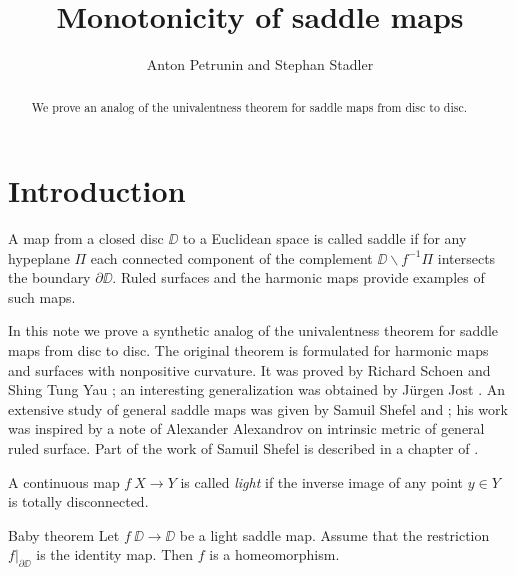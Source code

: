 \documentclass{article}
\begin{document}
\title{Monotonicity of saddle maps}
\author{Anton Petrunin and Stephan Stadler}


\date{}

\maketitle

\begin{abstract}
We prove an analog of the univalentness theorem for saddle maps from disc to disc.
\end{abstract}

\section{Introduction}

A map from a closed disc $\DD$ to a Euclidean space is called saddle if for any hypeplane $\Pi$ each connected component of the complement $\DD\backslash f^{-1}\Pi$ intersects the boundary $\partial \DD$.
Ruled surfaces and the harmonic maps provide examples of such maps.

In this note we prove a synthetic analog of the univalentness theorem for saddle maps from disc to disc.
The original theorem is formulated for harmonic maps and  surfaces with nonpositive curvature.
It was proved by Richard Schoen and Shing Tung Yau \cite{schoen-yau};
an interesting generalization was obtained by J\"urgen Jost \cite{jost}.
An extensive study of general saddle maps was given by Samuil Shefel \cite{shefel-2D} and \cite{shefel-3D};
his work was inspired by a note of Alexander Alexandrov \cite{A} on intrinsic metric of general ruled surface.
Part of the work of Samuil Shefel is described in a chapter of \cite{akp}.

A continuous map $f\:X\to Y$ is called \emph{light} if the inverse image of any point $y\in Y$ is totally disconnected.

\begin{thm}{Baby theorem}\label{baby}
Let $f\:\DD\to \DD$ be a light saddle map.
Assume that 
the restriction $f|_{\partial\DD}$ is the identity map.
Then $f$ is a homeomorphism.
\end{thm}
\end{document}
